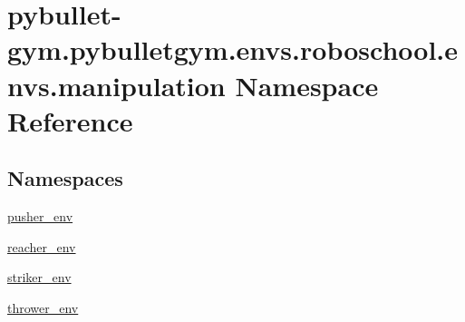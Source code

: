 \hypertarget{namespacepybullet-gym_1_1pybulletgym_1_1envs_1_1roboschool_1_1envs_1_1manipulation}{}\section{pybullet-\/gym.pybulletgym.\+envs.\+roboschool.\+envs.\+manipulation Namespace Reference}
\label{namespacepybullet-gym_1_1pybulletgym_1_1envs_1_1roboschool_1_1envs_1_1manipulation}
\subsection*{Namespaces}
\begin{DoxyCompactItemize}
\item 
 \hyperlink{namespacepybullet-gym_1_1pybulletgym_1_1envs_1_1roboschool_1_1envs_1_1manipulation_1_1pusher__env}{pusher\+\_\+env}
\item 
 \hyperlink{namespacepybullet-gym_1_1pybulletgym_1_1envs_1_1roboschool_1_1envs_1_1manipulation_1_1reacher__env}{reacher\+\_\+env}
\item 
 \hyperlink{namespacepybullet-gym_1_1pybulletgym_1_1envs_1_1roboschool_1_1envs_1_1manipulation_1_1striker__env}{striker\+\_\+env}
\item 
 \hyperlink{namespacepybullet-gym_1_1pybulletgym_1_1envs_1_1roboschool_1_1envs_1_1manipulation_1_1thrower__env}{thrower\+\_\+env}
\end{DoxyCompactItemize}
